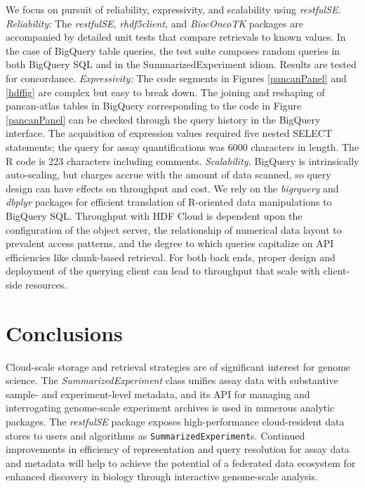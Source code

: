 \documentclass[applications]{gen-bioinformatics}
\newcommand{\Rpackage}[1]{{\textit{#1}}}
\newcommand{\Rclass}[1]{{\textit{#1}}}
\begin{document}
We focus on pursuit of reliability,
expressivity, and scalability using \Rpackage{restfulSE}.  
\textit{Reliability:} 
The \Rpackage{restfulSE}, \Rpackage{rhdf5client},
and \Rpackage{BiocOncoTK} packages are accompanied by detailed unit
tests that compare retrievals to known values.  In the
case of BigQuery table queries, the test
suite composes random queries 
in both BigQuery SQL and in the SummarizedExperiment idiom.  Results
are tested for concordance.  \textit{Expressivity:} The code
segments in Figures \ref{pancanPanel} and \ref{hdffig} are
complex but easy to break down.  The joining and
reshaping of pancan-atlas tables in BigQuery corresponding
to the code in Figure \ref{pancanPanel}
can be checked through the query history in the BigQuery
interface.  The acquisition of expression values required
five nested SELECT statements; the query for assay quantifications
was 6000 characters in length.
The R code is 223 characters including comments.
\textit{Scalability.}  BigQuery is intrinsically auto-scaling,
but charges accrue with the amount of data scanned, 
so query design can have effects on throughput
and cost.  We rely on the \Rpackage{bigrquery} and \Rpackage{dbplyr} packages for
efficient translation of R-oriented data manipulations to 
BigQuery SQL.  Throughput with HDF Cloud 
is dependent upon the configuration of the object server,
the relationship of numerical data layout to prevalent access
patterns, and the degree to which queries capitalize on
API efficiencies like chunk-based retrieval.  For both
back ends, proper design and deployment of the querying client can
lead to throughput that scale with client-side resources.

\section*{Conclusions}

Cloud-scale storage and retrieval strategies are of significant
interest for genome science.  The \Rclass{SummarizedExperiment} class
unifies assay data with substantive sample- and experiment-level
metadata, and its API for managing and interrogating
genome-scale experiment archives is used in numerous
analytic packages.  The \Rpackage{restfulSE} package exposes high-performance
cloud-resident data stores to users and
algorithms as \verb+SummarizedExperiment+s.  Continued improvements
in efficiency of
representation and query resolution for assay data and metadata
will help to achieve the potential of a federated data ecosystem for
enhanced discovery in biology through interactive genome-scale analysis.
\end{document}
